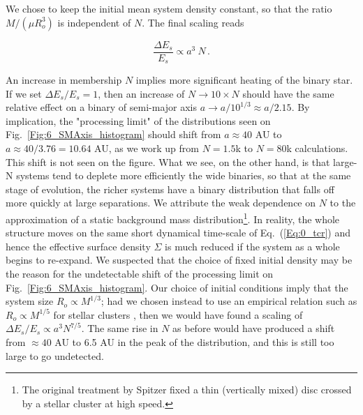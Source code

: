 We chose to keep the initial mean system density constant, so that the ratio $ M/( \mu R_o^3)$ is independent of $N$. The final scaling reads  
  
\begin{equation}
\frac{\Delta E_s}{E_s}  \propto a^3 ~ N \, .
\end{equation}

An increase in membership $N$ implies more significant heating of the binary star. If we set $\Delta E_s/E_s = 1$, then an increase of $N \rightarrow 10 \times N$ should have the same relative effect on a binary of semi-major axis $a \rightarrow a / 10^{1/3} \approx a / 2.15$. 
By implication, the "processing limit" of the distributions seen on Fig.~\ref{Fig:6_SMAxis_histogram} should shift from 
$a \approx 40 $ AU to $ a \approx 40 / 3.76 = 10.64 $ AU, as we work up from $N = 1.5$k to $N = 80$k calculations. 
This shift is not seen on the figure. What we see, on the other hand, is that large-N systems tend to deplete more efficiently the wide binaries, so that at the same stage of evolution, the richer systems have a binary distribution that falls off more quickly at large separations. We attribute the weak dependence on $N$ to the approximation of a static background mass distribution\footnote{The original treatment by Spitzer fixed a thin (vertically mixed) disc crossed by a stellar cluster at high speed.}. In reality, the whole structure moves on the same short dynamical time-scale of Eq.~(\ref{Eq:0_tcr}) and hence the effective surface density $\Sigma$ is much reduced if the system as a whole begins to re-expand.  We suspected that the choice of fixed initial density may be the reason for the undetectable shift of the processing limit on Fig.~\ref{Fig:6_SMAxis_histogram}. Our choice of initial conditions imply that the system size $R_o \propto M^{1/3}$; had we chosen instead to use an empirical relation such as $R_o \propto M^{1/5}$ for stellar clusters \citep{Larsen2004}, then we would have found a scaling of $\Delta E_s /E_s \propto a^3 N^{7/5} $. The same rise in $N$ as before would have produced a shift from $\approx 40$ AU to 6.5 AU in the peak of the distribution, and this is still too large to go undetected. 

